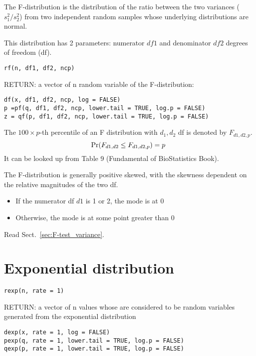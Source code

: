 The F-distribution is the distribution of the ratio between the two
variances ($s_1^2/s_2^2$) from two independent random samples whose underlying
distributions are normal.

This distribution has 2 parameters: numerator $df1$ and denominator
$df2$ degrees of freedom (df).

\begin{verbatim}
rf(n, df1, df2, ncp)
\end{verbatim}
RETURN: a vector of n random variable of the F-distribution:
\begin{verbatim}
df(x, df1, df2, ncp, log = FALSE)
p =pf(q, df1, df2, ncp, lower.tail = TRUE, log.p = FALSE)
z = qf(p, df1, df2, ncp, lower.tail = TRUE, log.p = FALSE)
\end{verbatim}

The $100\times p$-th percentile of an F distribution with $d_1,d_2$ df
is denoted by $F_{d1,d2,p}$.
\begin{equation}
  \label{eq:87}
  \text{Pr}(F_{d1,d2} \le F_{d1,d2,p}) = p
\end{equation}
It can be looked up from Table 9 (Fundamental of BioStatistics Book). 

The F-distribution is generally positive skewed, with the skewness
dependent on the relative magnitudes of the two df. 
\begin{itemize}
\item If the numerator df $d1$ is 1 or 2, the mode is at 0
\item Otherwise, the mode is at some point greater than 0
\end{itemize}

Read Sect.~\ref{sec:F-test_variance}.

\section{Exponential distribution}
\label{sec:expon-distr}

\begin{verbatim}
rexp(n, rate = 1)
\end{verbatim}
RETURN: a vector of n values whose are considered to be random
variables generated from the exponential distribution

\begin{verbatim}
dexp(x, rate = 1, log = FALSE)
pexp(q, rate = 1, lower.tail = TRUE, log.p = FALSE)
qexp(p, rate = 1, lower.tail = TRUE, log.p = FALSE)
\end{verbatim}




